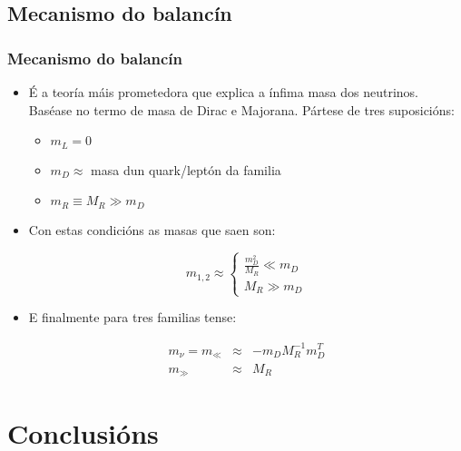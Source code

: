 \documentclass[10pt]{beamer}
\newcommand{\beq}{\begin{equation}}
\newcommand{\eeq}{\end{equation}}
\newcommand{\bea}{\begin{eqnarray}}
\newcommand{\eea}{\end{eqnarray}}
\newcommand{\bi}{\begin{itemize}}
\newcommand{\ei}{\end{itemize}}
\newcommand{\bc}{\begin{cases}}
\newcommand{\ec}{\end{cases}}
\begin{document}
\subsection{Mecanismo do balancín}

\begin{frame} \frametitle{Mecanismo do balancín}
\bi

\item É a teoría máis prometedora que explica a ínfima masa dos neutrinos. Baséase no termo de masa de Dirac e Majorana. Pártese de tres suposicións:
\bi

\item $m_L = 0$

\item $m_D \approx$ masa dun quark/leptón da familia

\item $m_R \equiv M_R \gg m_D$

\ei

\item Con estas condicións as masas que saen son:

\beq
m_{1,2} \approx
\bc
\frac{m_D^2}{M_R} \ll m_D \\
M_R \gg m_D
\ec \nonumber
\eeq

\item E finalmente para tres familias tense:

\bea
m_\nu = m_\ll &\approx& - m_D M_R^{-1} m_D^T \nonumber \\
m_\gg &\approx& M_R \nonumber
\eea

\ei
\end{frame}

\section{Conclusións}
\end{document}
